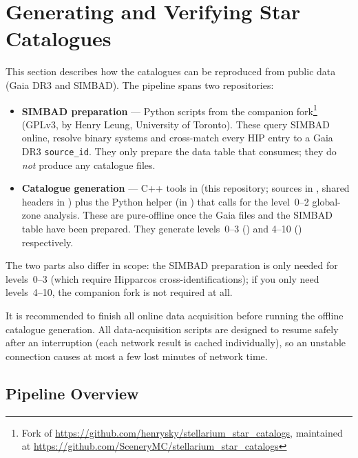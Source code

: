 \section{Generating and Verifying Star Catalogues}
\label{sec:StarCatalogues:Generating}

This section describes how the  catalogues can be
reproduced from public data (Gaia DR3 and SIMBAD). The pipeline spans two
repositories:

\begin{itemize}
  \item \textbf{SIMBAD preparation} --- Python scripts from the companion
        fork\footnote{Fork of \url{https://github.com/henrysky/stellarium_star_catalogs},
        maintained at \url{https://github.com/SceneryMC/stellarium_star_catalogs}}
        (GPLv3, by Henry Leung, University of Toronto). These query SIMBAD
        online, resolve binary systems and cross-match every HIP entry to a
        Gaia DR3 \texttt{source\_id}. They only prepare the data table
         that 
        consumes; they do \emph{not} produce any catalogue files.
  \item \textbf{Catalogue generation} --- C++ tools in 
        (this repository; sources in , shared headers in
        ) plus the  Python helper
        (in ) that  calls for the
        level~0--2 global-zone analysis.
        These are pure-offline once the Gaia  files and the
        SIMBAD table have been prepared. They generate levels~0--3
        () and 4--10 () respectively.
\end{itemize}

The two parts also differ in scope:
the SIMBAD preparation is only needed for levels~0--3 (which require
Hipparcos cross-identifications); if you only need levels~4--10, the
companion fork is not required at all.

It is recommended to finish all online data acquisition before running
the offline catalogue generation. All data-acquisition scripts are
designed to resume safely after an interruption (each network result is
cached individually), so an unstable connection causes at most a few
lost minutes of network time.

\subsection{Pipeline Overview}
\label{sec:StarCatalogues:Generating:Overview}

